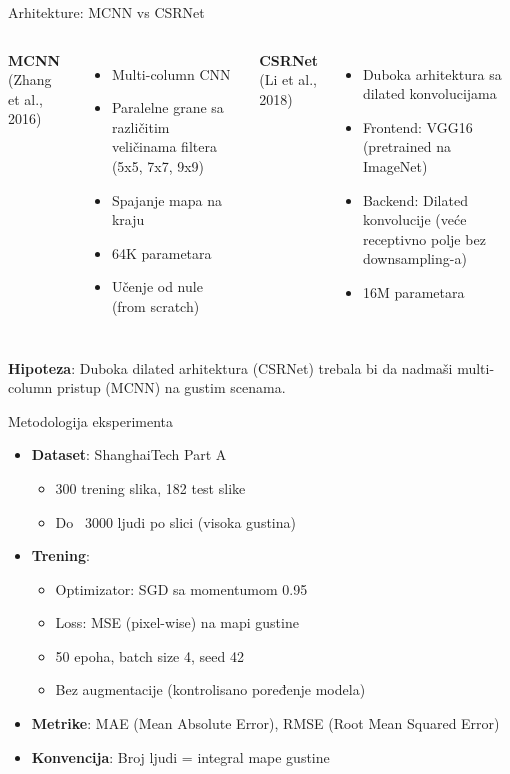 \documentclass[aspectratio=169]{beamer}
\begin{document}
\begin{frame}{Arhitekture: MCNN vs CSRNet}
    \begin{columns}[T]
        \textbf{MCNN} (Zhang et al., 2016)
        \begin{itemize}
            \item Multi-column CNN
            \item Paralelne grane sa različitim veličinama filtera (5x5, 7x7, 9x9)
            \item Spajanje mapa na kraju
            \item 64K parametara
            \item Učenje od nule (from scratch)
        \end{itemize}
        
        \textbf{CSRNet} (Li et al., 2018)
        \begin{itemize}
            \item Duboka arhitektura sa dilated konvolucijama
            \item Frontend: VGG16 (pretrained na ImageNet)
            \item Backend: Dilated konvolucije (veće receptivno polje bez downsampling-a)
            \item 16M parametara
        \end{itemize}
    \end{columns}
    
    \vspace{0.5cm}
    \textbf{Hipoteza}: Duboka dilated arhitektura (CSRNet) trebala bi da nadmaši multi-column pristup (MCNN) na gustim scenama.
\end{frame}

\begin{frame}{Metodologija eksperimenta}
    \begin{itemize}
        \item \textbf{Dataset}: ShanghaiTech Part A
        \begin{itemize}
            \item 300 trening slika, 182 test slike
            \item Do ~3000 ljudi po slici (visoka gustina)
        \end{itemize}
        \item \textbf{Trening}:
        \begin{itemize}
            \item Optimizator: SGD sa momentumom 0.95
            \item Loss: MSE (pixel-wise) na mapi gustine
            \item 50 epoha, batch size 4, seed 42
            \item Bez augmentacije (kontrolisano poređenje modela)
        \end{itemize}
        \item \textbf{Metrike}: MAE (Mean Absolute Error), RMSE (Root Mean Squared Error)
        \item \textbf{Konvencija}: Broj ljudi = integral mape gustine
    \end{itemize}
\end{frame}
\end{document}
